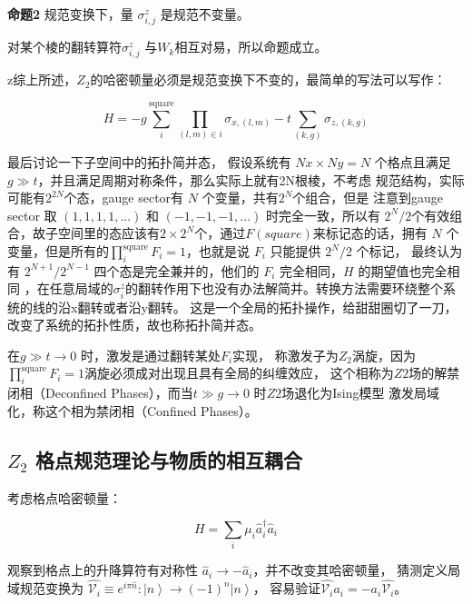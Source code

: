 \documentclass[a4paper]{article}
\begin{document}
\hspace*{\fill}

\textbf{命题2} 规范变换下，量 $\sigma^z_{i,j}$ 是规范不变量。

\hspace*{\fill}

对某个棱的翻转算符$\sigma^z_{i,j}$ 与$W_k$相互对易，所以命题成立。

\hspace*{\fill}

z综上所述，$Z_2$的哈密顿量必须是规范变换下不变的，最简单的写法可以写作：

$$
H = -g \sum_i^{\text{square}} \prod_{(l,m) \in i}  \sigma_{x,(l,m)} -t \sum_{(k,g)} \sigma_{z,(k,g)}  
$$

最后讨论一下子空间中的拓扑简并态，
假设系统有 $Nx \times Ny =N$ 个格点且满足$g \gg t$，并且满足周期对称条件，那么实际上就有2N根棱，不考虑
规范结构，实际可能有$2^{2N}$个态，gauge sector有 $N$ 个变量，共有$2^N$个组合，但是
注意到gauge sector 取 $(1,1,1,1,...)$ 和 $(-1,-1,-1,...)$ 时完全一致，所以有
$2^N/2$个有效组合，故子空间里的态应该有$2\times 2^N$个，通过$F(square)$来标记态的话，拥有 $N$
个变量，但是所有的$\prod_i^{\text{square}} F_i = 1$，也就是说 $F_i$ 只能提供 $2^N/2$ 个标记，
最终认为有 $2^{N+1}/2^{N-1}$ 四个态是完全兼并的，他们的 $F_i$ 完全相同，$H$ 的期望值也完全相同
，在任意局域的$\sigma^z_i$的翻转作用下也没有办法解简并。转换方法需要环绕整个系统的线的沿x翻转或者沿y翻转。
这是一个全局的拓扑操作，给甜甜圈切了一刀，改变了系统的拓扑性质，故也称拓扑简并态。

在$g\gg t\rightarrow 0 $ 时，激发是通过翻转某处$F_i$实现，
称激发子为$Z_2$涡旋，因为$\prod_i^{\text{square}} F_i = 1$涡旋必须成对出现且具有全局的纠缠效应，
这个相称为$Z2$场的解禁闭相（Deconfined Phases），而当$t\gg g\rightarrow 0$ 时$Z2$场退化为Ising模型
激发局域化，称这个相为禁闭相（Confined Phases）。



\subsection{$Z_2$ 格点规范理论与物质的相互耦合}


考虑格点哈密顿量：

$$
H=\sum_i \mu_i \hat{a}_i^{\dagger} \hat{a}_i
$$

观察到格点上的升降算符有对称性 $\hat a_i \rightarrow -\hat a_i$，并不改变其哈密顿量，
猜测定义局域规范变换为 $\hat{\mathcal{V}_i}\equiv e^{i\pi\hat{n}}: \left|n\right>\rightarrow (-1)^n\left|n\right>$，
容易验证$\hat{\mathcal{V}_i} a_i = -a_i \hat{\mathcal{V}_i}$。
\end{document}
